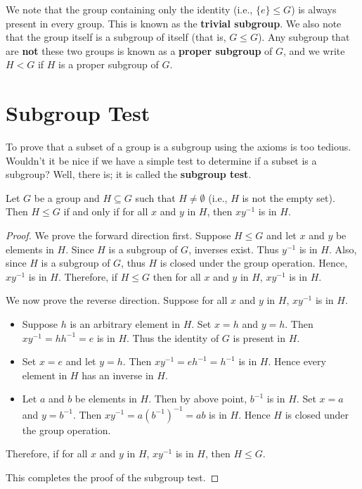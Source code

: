 We note that the group containing only the identity (i.e., $\{e\} \leq G$) is always present in every group. This is known as the \textbf{trivial subgroup}. We also note that the group itself is a subgroup of itself (that is, $G \leq G$). Any subgroup that are \textbf{not} these two groups is known as a \textbf{proper subgroup} of $G$, and we write $H < G$ if $H$ is a proper subgroup of $G$.

\section{Subgroup Test}
To prove that a subset of a group is a subgroup using the axioms is too tedious. Wouldn't it be nice if we have a simple test to determine if a subset is a subgroup? Well, there is; it is called the \textbf{subgroup test}.
\begin{proposition}
    Let $G$ be a group and $H \subseteq G$ such that $H \neq \emptyset$ (i.e., $H$ is not the empty set). Then $H \leq G$ if and only if for all $x$ and $y$ in $H$, then $xy^{-1}$ is in $H$.
\end{proposition}
\begin{proof}
    We prove the forward direction first. Suppose $H \leq G$ and let $x$ and $y$ be elements in $H$. Since $H$ is a subgroup of $G$, inverses exist. Thus $y^{-1}$ is in $H$. Also, since $H$ is a subgroup of $G$, thus $H$ is closed under the group operation. Hence, $xy^{-1}$ is in $H$. Therefore, if $H \leq G$ then for all $x$ and $y$ in $H$, $xy^{-1}$ is in $H$.

    We now prove the reverse direction. Suppose for all $x$ and $y$ in $H$, $xy^{-1}$ is in $H$.
    \begin{itemize}
        \item Suppose $h$ is an arbitrary element in $H$. Set $x = h$ and $y = h$. Then $xy^{-1} = hh^{-1} = e$ is in $H$. Thus the identity of $G$ is present in $H$.
        \item Set $x = e$ and let $y = h$. Then $xy^{-1} = eh^{-1} = h^{-1}$ is in $H$. Hence every element in $H$ has an inverse in $H$.
        \item Let $a$ and $b$ be elements in $H$. Then by above point, $b^{-1}$ is in $H$. Set $x = a$ and $y = b^{-1}$. Then $xy^{-1} = a\left(b^{-1}\right)^{-1} = ab$ is in $H$. Hence $H$ is closed under the group operation.
    \end{itemize}
    Therefore, if for all $x$ and $y$ in $H$, $xy^{-1}$ is in $H$, then $H \leq G$.

    This completes the proof of the subgroup test.
\end{proof}

